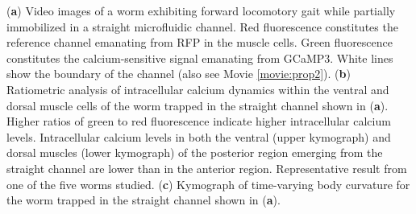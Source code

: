 \begin{FPfigure}
{(\textbf{a}) Video images of a worm exhibiting forward locomotory gait while partially immobilized in a straight 
microfluidic channel. Red fluorescence constitutes the reference channel emanating from RFP in the 
muscle cells. Green fluorescence constitutes the calcium-sensitive signal emanating from GCaMP3. 
White lines show the boundary of the channel (also see Movie  \ref{movie:prop2}). 
(\textbf{b}) Ratiometric analysis of intracellular calcium dynamics within the ventral and dorsal muscle cells 
of the worm trapped in the straight channel shown in (\textbf{a}). Higher ratios of green to red fluorescence 
indicate higher intracellular calcium levels. Intracellular calcium levels in both the ventral (upper 
kymograph) and dorsal muscles (lower kymograph) of the posterior region emerging from the straight 
channel are lower than in the anterior region. Representative result from one of the five worms studied. 
(\textbf{c}) Kymograph of time-varying body curvature for the worm trapped in the straight channel shown in (\textbf{a}). 
\label{fig:prop_sup2}}
\end{FPfigure}

